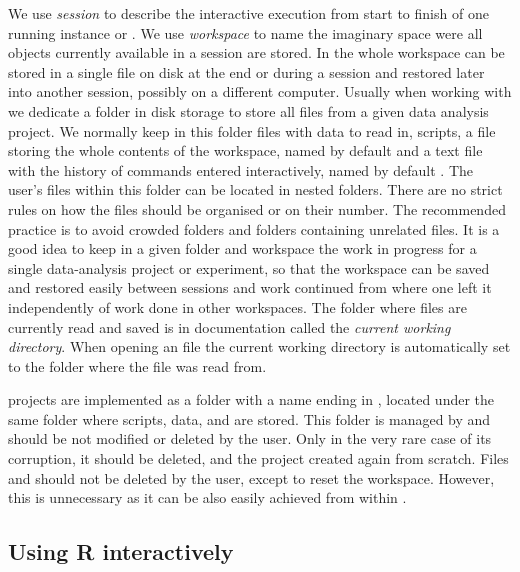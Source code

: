 \documentclass[krantz2]{krantz}\usepackage{knitr}
\begin{document}
We use \emph{session} to describe the interactive execution from start to finish of one running instance or \Rpgrm. We use \emph{workspace} to name the imaginary space were all objects currently available in a session are stored. In \Rlang the whole workspace can be stored in a single file on disk at the end or during a session and restored later into another session, possibly on a different computer. Usually when working with \Rlang we dedicate a folder in disk storage to store all files from a given data analysis project. We normally keep in this folder files with data to read in, scripts, a file storing the whole contents of the workspace, named by default  and a text file with the history of commands entered interactively, named by default . The user's files within this folder can be located in nested folders. There are no strict rules on how the files should be organised or on their number. The recommended practice is to avoid crowded folders and folders containing unrelated files. It is a good idea to keep in a given folder and workspace the work in progress for a single data-analysis project or experiment, so that the workspace can be saved and restored easily between sessions and work continued from where one left it independently of work done in other workspaces. The folder where files are currently read and saved is in \Rlang documentation called the \emph{current working directory}. When opening an  file the current working directory is automatically set to the folder where the  file was read from.

\begin{warningbox}
\RStudio projects are implemented as a folder with a name ending in , located under the same folder where scripts, data,  and  are stored. This folder is managed by \RStudio and should be not modified or deleted by the user. Only in the very rare case of its corruption, it should be deleted, and the \RStudio project created again from scratch. Files  and  should not be deleted by the user, except to reset the \Rlang workspace. However, this is unnecessary as it can be also easily achieved from within \Rpgrm.
\end{warningbox}

\subsection{Using R interactively}
\end{document}
